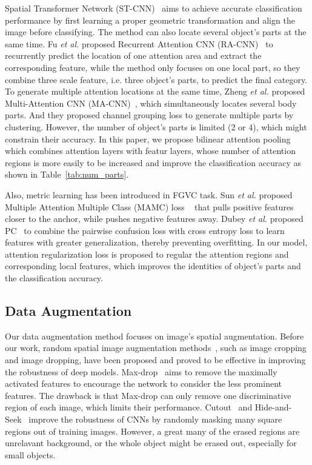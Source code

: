 \documentclass[10pt,twocolumn,letterpaper]{article}
\def\etal{{\em et al. }}
\begin{document}
Spatial Transformer Network (ST-CNN)~\cite{stn} aims to achieve accurate classification performance by first learning a proper geometric transformation and align the image before classifying. The method can also locate several object's parts at the same time. Fu \etal proposed Recurrent Attention CNN (RA-CNN)~\cite{ra-cnn} to recurrently predict the location of one attention area and extract the corresponding feature, while the method only focuses on one local part, so they combine three scale feature, i.e. three object's parts, to predict the final category.
To generate multiple attention locations at the same time, Zheng \etal proposed Multi-Attention CNN (MA-CNN)~\cite{ma-cnn}, which simultaneously locates several body parts. And they proposed channel grouping loss to generate multiple parts by clustering. However, the number of object's parts is limited (2 or 4), which might constrain their accuracy. In this paper, we propose bilinear attention pooling which combines attention layers with featur layers, whose number of attention regions is more easily to be increased and improve the classification accuracy as shown in Table~\ref{tab:num_parts}.

Also, metric learning has been introduced in FGVC task. Sun \etal proposed Multiple Attention Multiple Class (MAMC) loss ~\cite{mamc} that pulls positive features closer to the anchor, while pushes negative features away. Dubey \etal proposed PC~\cite{pairwise_confusion} to combine the pairwise confusion loss with cross entropy loss to learn features with greater generalization, thereby preventing overfitting. In our model, attention regularization loss is proposed to regular the attention regions and corresponding local features, which improves the identities of object's parts and the classification accuracy.

\subsection{Data Augmentation}
Our data augmentation method focuses on image's spatial augmentation. Before our work, random spatial image augmentation methods~\cite{max-drop, cutout, hide-and-seek}, such as image cropping and image dropping, have been proposed and proved to be effective in improving the robustness of deep models. Max-drop~\cite{max-drop} aims to remove the maximally activated features to encourage the network to consider the less prominent features. The drawback is that Max-drop can only remove one discriminative region of each image, which limits their performance. Cutout~\cite{cutout} and Hide-and-Seek~\cite{hide-and-seek} improve the robustness of CNNs by randomly masking many square regions out of training images. However, a great many of the erased regions are unrelavant background, or the whole object might be erased out, especially for small objects.
\end{document}
